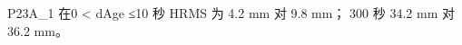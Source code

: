 \documentclass[11pt,a4paper]{article}
\numberwithin{equation}{section}
\numberwithin{figure}{section}
\begin{document}
P23A\_1 {\cjkfont 在}\allowbreak{}0 < dAge ≤10 {\cjkfont 秒}\allowbreak{} HRMS {\cjkfont 为}\allowbreak{} 4.2 mm {\cjkfont 对}\allowbreak{} 9.8 mm{\cjkfont ；}\allowbreak{} 300 {\cjkfont 秒}\allowbreak{} 34.2 mm {\cjkfont 对}\allowbreak{} 36.2 mm{\cjkfont 。}\allowbreak{}
\end{document}

